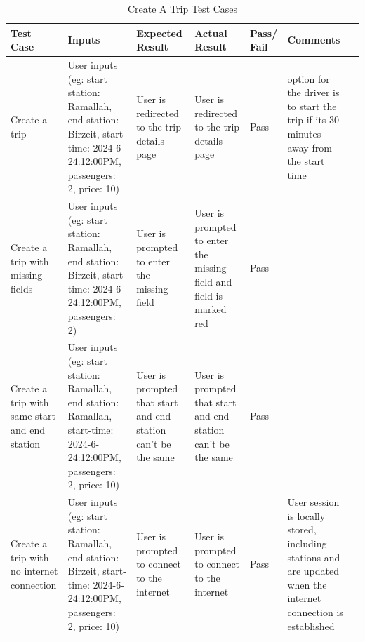 \documentclass[a4paper, 12pt]{report} %
\begin{document}
                \begin{spacing}{1}
                    \begin{table}[H]
                        \centering
                        \label{tab:create_trip_test}
                        \begin{tabularx}{\linewidth}{| R{2cm}|R{3cm}|R{2cm}|R{2cm}|R{2cm}|R{2cm}|R{2cm}|}
                            \hline
                             \textbf{Test Case} & \textbf{Inputs} & \textbf{Expected Result} & \textbf{Actual Result} & \textbf{Pass/ Fail} & \textbf{Comments} \\
                            \hline
                            Create a trip & User inputs (eg: start station: Ramallah, end station: Birzeit, start-time: 2024-6-24:12:00PM, passengers: 2, price: 10) & User is redirected to the trip details page & User is redirected to the trip details page & Pass & option for the driver is to start the trip if its 30 minutes away from the start time\\
                            \hline
                            Create a trip with missing fields & User inputs (eg: start station: Ramallah, end station: Birzeit, start-time: 2024-6-24:12:00PM, passengers: 2) & User is prompted to enter the missing field & User is prompted to enter the missing field and field is marked red & Pass & \\
                            \hline
                            Create a trip with same start and end station & User inputs (eg: start station: Ramallah, end station: Ramallah, start-time: 2024-6-24:12:00PM, passengers: 2, price: 10) & User is prompted that start and end station can't be the same & User is prompted that start and end station can't be the same & Pass & \\
                            \hline
                            Create a trip with no internet connection & User inputs (eg: start station: Ramallah, end station: Birzeit, start-time: 2024-6-24:12:00PM, passengers: 2, price: 10) & User is prompted to connect to the internet & User is prompted to connect to the internet & Pass & User session is locally stored, including stations and are updated when the internet connection is established\\
                            \hline
                        \end{tabularx}
                        \caption{Create A Trip Test Cases}
                    \end{table}
                \end{spacing}
\end{document}

